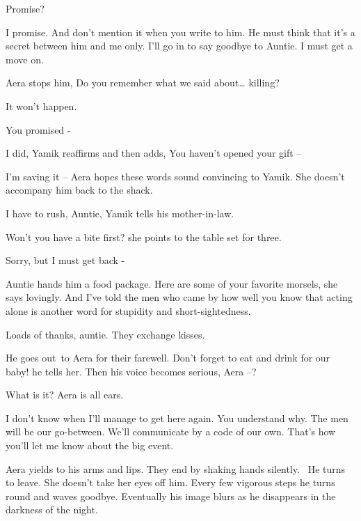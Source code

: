\documentclass[twoside,11pt]{book}
\begin{document}
{\textquotedbl}Promise?{\textquotedbl} 

{\textquotedbl}I promise. And don't mention it when you write to him. He must think that it's a secret between him and
me only. I'll go in to say goodbye to Auntie. I must get a move on.{\textquotedbl} 

Aera stops him, {\textquotedbl}Do you remember what we said about{\dots} killing?{\textquotedbl} 

{\textquotedbl}It won't happen.{\textquotedbl} 

{\textquotedbl}You promised -{\textquotedbl} 

{\textquotedbl}I did,{\textquotedbl} Yamik reaffirms and then adds, {\textquotedbl}You haven't opened your gift
--{\textquotedbl}

{\textquotedbl}I'm saving it --{\textquotedbl} Aera hopes these words sound convincing to Yamik. She doesn't accompany
him back to the shack.

{\textquotedbl}I have to rush, Auntie,{\textquotedbl} Yamik tells his mother-in-law. 

{\textquotedbl}Won't you have a bite first?{\textquotedbl} she points to the table set for three. 

{\textquotedbl}Sorry, but I must get back -{\textquotedbl} 

Auntie hands him a food package. {\textquotedbl}Here are some of your favorite morsels,{\textquotedbl} she says
lovingly. {\textquotedbl}And I've told the men who came by how well you know that acting alone is another word for
stupidity and short-sightedness.{\textquotedbl} 

{\textquotedbl}Loads of thanks, auntie.{\textquotedbl} They exchange kisses. 

He goes out{\ }to Aera for their farewell. {\textquotedbl}Don't forget to eat and drink for our
baby!{\textquotedbl} he tells her. Then his voice becomes serious, {\textquotedbl}Aera --?{\textquotedbl}

{\textquotedbl}What is it?{\textquotedbl} Aera is all ears.

{\textquotedbl}I don't know when I'll manage to get here again. You understand why. The men will be our go-between.
We'll communicate by a code of our own. That's how you'll let me know about the big event.{\textquotedbl} 

Aera yields to his arms and lips. They end by shaking hands silently. ~He turns to leave. She doesn't take her eyes off
him. Every few vigorous steps he turns round and waves goodbye. Eventually his image blurs as he disappears in the
darkness of the night. 
\end{document}
